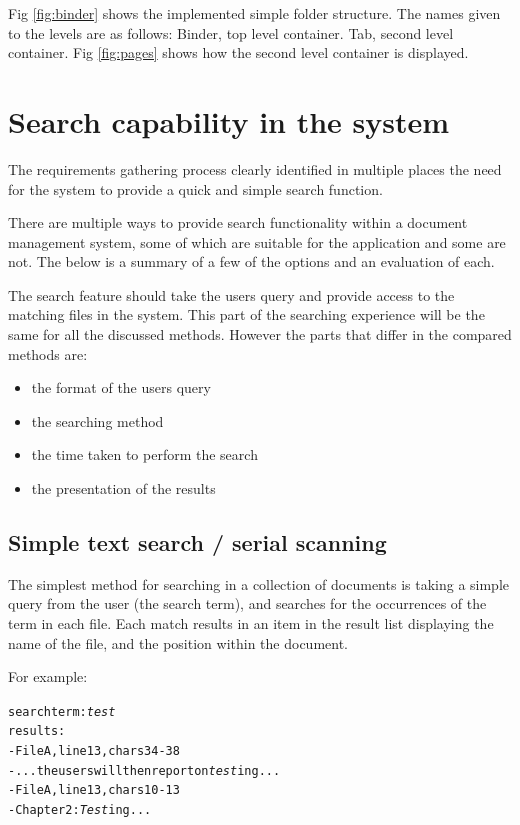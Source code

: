 Fig \ref{fig:binder} shows the implemented simple folder structure. The names
given to the levels are as follows: Binder, top level container. Tab, second
level container. Fig \ref{fig:pages} shows how the second level container is
displayed.

\section{Search capability in the system}\label{search-capability-in-the-system}

The requirements gathering process clearly identified in multiple places the
need for the system to provide a quick and simple search function.

There are multiple ways to provide search functionality within a document
management system, some of which are suitable for the application and some are
not. The below is a summary of a few of the options and an evaluation of each.

The search feature should take the users query and provide access to the
matching files in the system. This part of the searching experience will be the
same for all the discussed methods. However the parts that differ in the
compared methods are:
\begin{itemize}
  \item the format of the users query
  \item the searching method
  \item the time taken to perform the search
  \item the presentation of the results
\end{itemize}

\subsection{Simple text search / serial scanning}%
\label{simple-text-search-serial-scanning}

The simplest method for searching in a collection of documents is taking a
simple query from the user (the search term), and searches for the occurrences
of the term in each file. Each match results in an item in the result list
displaying the name of the file, and the position within the document.

For example:

\begin{alltt}
    search term: \emph{test}
    results:
    - File A, line 13, chars 34-38
      - ... the users will then report on \emph{test}ing ...
    - File A, line 13, chars 10-13
      - Chapter 2: \emph{Test}ing ...
\end{alltt}

